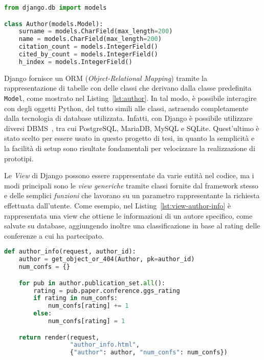 \begin{lstlisting}[language=Python, caption=La classe \texttt{Author}, label=lst:author]
from django.db import models

class Author(models.Model):
    surname = models.CharField(max_length=200)
    name = models.CharField(max_length=200)
    citation_count = models.IntegerField()
    cited_by_count = models.IntegerField()
    h_index = models.IntegerField()
\end{lstlisting}

Django fornisce un ORM (\textit{Object-Relational Mapping}) tramite la
rappresentazione di tabelle con delle classi che derivano dalla classe
predefinita \texttt{Model}, come mostrato nel Listing~\ref{lst:author}. In
tal modo, è possibile interagire con degli oggetti Python, del tutto simili
alle classi, astraendo completamente dalla tecnologia di database utilizzata.
Infatti, con Django è possibile utilizzare diversi DBMS~\cite{djangoDBMS}, tra cui PostgreSQL,
MariaDB, MySQL e SQLite. Quest'ultimo è stato scelto per essere usato in questo
progetto di tesi, in quanto la semplicità e la facilità di setup sono risultate
fondamentali per velocizzare la realizzazione di prototipi.

Le \textit{View} di Django possono essere rappresentate da varie entità nel codice,
ma i modi principali sono le \textit{view generiche} tramite classi fornite dal framework
stesso e delle semplici \textit{funzioni} che lavorano su un parametro rappresentante
la richiesta effettuata dall'utente. Come esempio, nel Listing~\ref{lst:view-author-info}
è rappresentata una view che ottiene le informazioni di un autore specifico,
come salvate su database, aggiungendo inoltre una classificazione in base al
rating delle conferenze a cui ha partecipato.

\begin{lstlisting}[language=Python,caption=La view \texttt{author\_info},label=lst:view-author-info]
def author_info(request, author_id):
    author = get_object_or_404(Author, pk=author_id)
    num_confs = {}

    for pub in author.publication_set.all():
        rating = pub.paper.conference.ggs_rating
        if rating in num_confs:
            num_confs[rating] += 1
        else:
            num_confs[rating] = 1

    return render(request,
                  "author_info.html",
                  {"author": author, "num_confs": num_confs})
\end{lstlisting}

